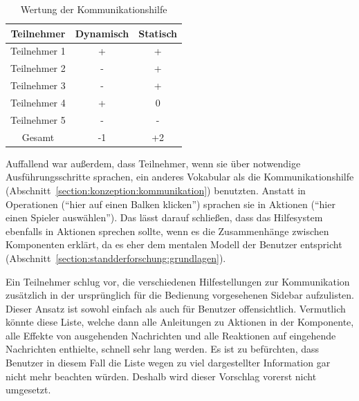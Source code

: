 \documentclass[
	headsepline,
	footsepline,
	fontsize=12pt,
	bibliography=totoc
]{scrbook}
\begin{document}
\begin{table}[htbp]
	\centering
    \begin{tabular}{c|c|c}
    Teilnehmer   & Dynamisch	& Statisch      \\
    \hline
    Teilnehmer 1 & +			& +  \\ %
    Teilnehmer 2 & -         	& +   \\ %
    Teilnehmer 3 & -         	& +    \\ %
    Teilnehmer 4 & +        	& 0     \\ %
    Teilnehmer 5 & -         	& -      \\ %
    \hline
    Gesamt		& -1			& +2 
    \end{tabular}
    \caption{Wertung der Kommunikationshilfe}
    \label{table:paper-mockup-kommunikationshilfe}
\end{table}

Auffallend war außerdem, dass Teilnehmer, wenn sie über notwendige Ausführungsschritte sprachen, ein anderes Vokabular als die Kommunikationshilfe (Abschnitt~\ref{section:konzeption:kommunikation}) benutzten. Anstatt in Operationen (\enquote{hier auf einen Balken klicken}) sprachen sie in Aktionen (\enquote{hier einen Spieler auswählen}). Das lässt darauf schließen, dass das Hilfesystem ebenfalls in Aktionen sprechen sollte, wenn es die Zusammenhänge zwischen Komponenten erklärt, da es eher dem mentalen Modell der Benutzer entspricht (Abschnitt~\ref{section:standderforschung:grundlagen}).

Ein Teilnehmer schlug vor, die verschiedenen Hilfestellungen zur Kommunikation zusätzlich in der ursprünglich für die Bedienung vorgesehenen Sidebar aufzulisten. Dieser Ansatz ist sowohl einfach als auch für Benutzer offensichtlich. Vermutlich könnte diese Liste, welche dann alle Anleitungen zu Aktionen in der Komponente, alle Effekte von ausgehenden Nachrichten und alle Reaktionen auf eingehende Nachrichten enthielte, schnell sehr lang werden. Es ist zu befürchten, dass Benutzer in diesem Fall die Liste wegen zu viel dargestellter Information gar nicht mehr beachten würden. Deshalb wird dieser Vorschlag vorerst nicht umgesetzt.
\end{document}
